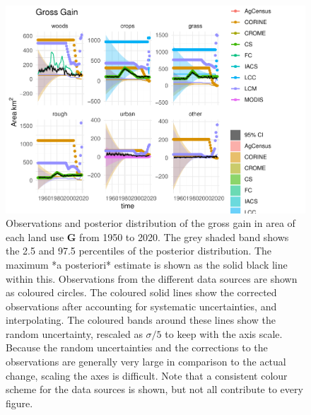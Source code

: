 \documentclass[
]{book}
\begin{document}
\begin{figure}
\includegraphics[width=1.3\linewidth]{Results_sc_files/figure-latex/plotG-1} \caption{ Observations and posterior distribution of the gross gain in area of each land use $\mathbf{G}$ from 1950 to 2020.  The grey shaded band shows the 2.5 and 97.5 percentiles of the posterior distribution. The maximum *a posteriori* estimate is shown as the solid black line within this. Observations from the different data sources are shown as coloured circles. The coloured solid lines show the corrected observations after accounting for systematic uncertainties, and interpolating. The coloured bands around these lines show the random uncertainty, rescaled as $\sigma /5$ to keep with the axis scale. Because the random uncertainties and the corrections to the observations are generally very large in comparison to the actual change, scaling the axes is difficult. Note that a consistent colour scheme for the data sources is shown, but not all contribute to every figure.}\label{fig:plotG}
\end{figure}
\end{document}
